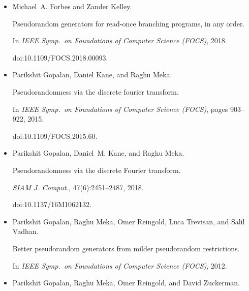 \begin{itemize}
David S. Dummit and Richard M. Foote.


\emph{Abstract Algebra}.


Wiley, 3rd edition, 2004.





\item[] 
[16]

Michael A. Forbes and Zander Kelley.


Pseudorandom generators for read-once branching programs, in any
order.


In \emph{IEEE Symp. on Foundations of Computer Science (FOCS)}, 2018.


doi:10.1109/FOCS.2018.00093.





\item[] 
[17]

Parikshit Gopalan, Daniel Kane, and Raghu Meka.


Pseudorandomness via the discrete fourier transform.


In \emph{IEEE Symp. on Foundations of Computer Science (FOCS)}, pages
903–922, 2015.


doi:10.1109/FOCS.2015.60.





\item[] 
[18]

Parikshit Gopalan, Daniel M. Kane, and Raghu Meka.


Pseudorandomness via the discrete Fourier transform.


\emph{SIAM J. Comput.}, 47(6):2451–2487, 2018.


doi:10.1137/16M1062132.





\item[] 
[19]

Parikshit Gopalan, Raghu Meka, Omer Reingold, Luca Trevisan, and Salil Vadhan.


Better pseudorandom generators from milder pseudorandom restrictions.


In \emph{IEEE Symp. on Foundations of Computer Science (FOCS)}, 2012.





\item[] 
[20]

Parikshit Gopalan, Raghu Meka, Omer Reingold, and David Zuckerman.



\end{itemize}
